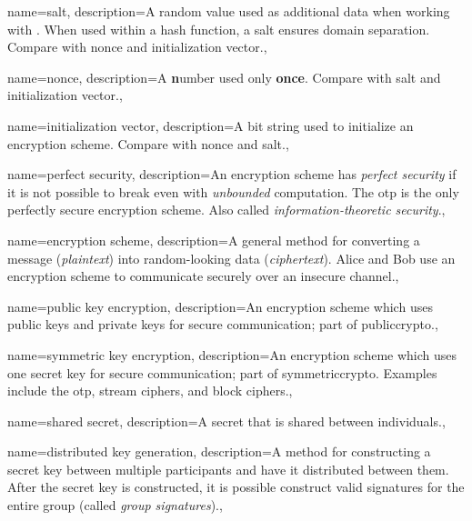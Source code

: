 
{
    name={salt},
    description={A random value used as additional data when working
        with .
        When used within a \gls{hash function}, a salt ensures
        domain separation.
        Compare with \gls{nonce} and \gls{initialization vector}.},
}

{
    name={nonce},
    description={A \textbf{n}umber used only \textbf{once}.
        Compare with \gls{salt} and \gls{initialization vector}.},
}

{
    name={initialization vector},
    description={A bit string used to initialize an
        \gls{encryption scheme}.
        Compare with \gls{nonce} and \gls{salt}.},
}

{
    name={perfect security},
    description={An \gls{encryption scheme} has \emph{perfect security}
        if it is not possible
        to break even with \emph{unbounded} computation.
        The \gls{otp} is the only perfectly secure \gls{encryption scheme}.
        Also called \emph{information-theoretic security}.},
}

{
    name={encryption scheme},
    description={A general method for converting a message (\emph{plaintext})
        into random-looking data (\emph{ciphertext}).
        Alice and Bob use an encryption scheme to communicate securely
        over an \gls{insecure channel}.},
}

{
    name={public key encryption},
    description={An \gls{encryption scheme} which uses public keys
        and private keys for secure communication; part of \gls{publiccrypto}.},
}

{
    name={symmetric key encryption},
    description={An \gls{encryption scheme} which uses one secret key
        for secure communication; part of \gls{symmetriccrypto}.
        Examples include the \gls{otp}, \glspl{stream cipher},
        and \glspl{block cipher}.},
}

{
    name={shared secret},
    description={A secret that is shared between individuals.},
}

{
    name={distributed key generation},
    description={A method for constructing a secret key between multiple
        participants and have it distributed between them.
        After the secret key is constructed, it is possible construct
        valid \glspl{signature} for the entire group
        (called \emph{group signatures}).},
}

